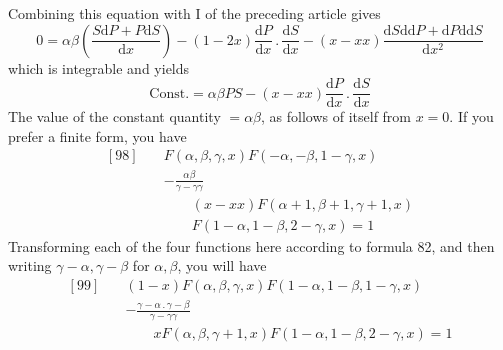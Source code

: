 Combining this equation with I of the preceding article gives
\[
0=\alpha\beta\left(\frac{S\mathrm dP+P\mathrm dS}{\mathrm dx}\right)
-(1-2x)\frac{\mathrm dP}{\mathrm dx}\mathbin{.}\frac{\mathrm dS}{\mathrm dx}
-(x-xx)\frac{\mathrm dS\mathrm{dd}P+\mathrm dP\mathrm{dd}S}{\mathrm dx^2}
\]
which is integrable and yields
\[
\mathrm{Const.}=\alpha\beta PS-(x-xx)\frac{\mathrm dP}{\mathrm dx}\mathbin{.}\frac{\mathrm dS}{\mathrm dx}
\]
The value of the constant quantity $=\alpha\beta$, as follows of itself from $x=0$. If you prefer a finite form, you have
\[
\begin{aligned}
{}[98]\quad&F(\alpha,\beta,\gamma,x)F(-\alpha,-\beta,1-\gamma,x)\\
&-\frac{\alpha\beta}{\gamma-\gamma\gamma}\\&\qquad(x-xx)F(\alpha+1,\beta+1,\gamma+1,x)\\&\qquad F(1-\alpha,1-\beta,2-\gamma,x)=1
\end{aligned}
\]
Transforming each of the four functions here according to formula 82, and then writing $\gamma-\alpha,\gamma-\beta$ for $\alpha,\beta$, you will have
\[
\begin{aligned}
{}[99]\quad&(1-x)F(\alpha,\beta,\gamma,x)F(1-\alpha,1-\beta,1-\gamma,x)\\
&-\frac{\gamma-\alpha\mathbin{.}\gamma-\beta}{\gamma-\gamma\gamma}\\&\qquad xF(\alpha,\beta,\gamma+1,x)F(1-\alpha,1-\beta,2-\gamma,x)=1
\end{aligned}
\]
